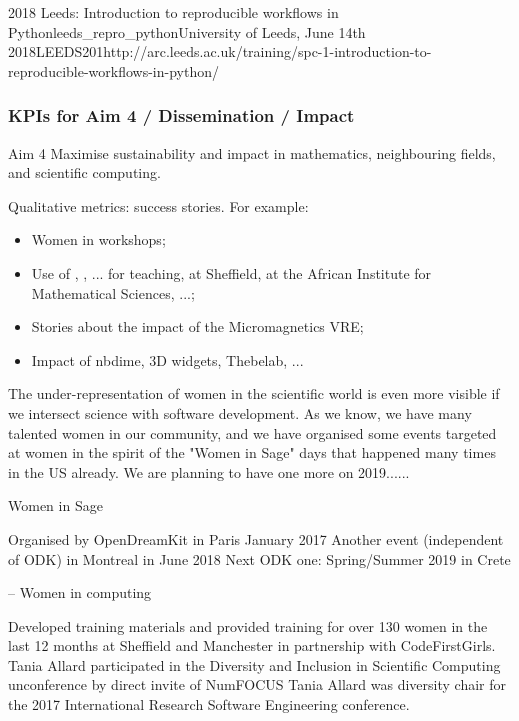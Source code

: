 \begin{Aim 1}
\begin{Aim 2}
\begin{event}{2018 Leeds: Introduction to reproducible workflows in Python}{leeds_repro_python}{University of Leeds, June 14th 2018}{LEEDS}{20}{1}{http://arc.leeds.ac.uk/training/spc-1-introduction-to-reproducible-workflows-in-python/}
\begin{itemize}
\subsubsection{KPIs for Aim 4 / Dissemination / Impact}

\begin{recommendation}{Aim 4}
  Maximise sustainability and impact in mathematics, neighbouring fields, and scientific computing.
\end{recommendation}

Qualitative metrics: success stories. For example:
\begin{itemize}
\item Women in \Sage workshops;
\item Use of \Jupyter, \cocalc, ... for teaching, at Sheffield, at the
  African Institute for Mathematical Sciences, ...;
\item Stories about the impact of the Micromagnetics VRE;
\item Impact of nbdime, 3D widgets, Thebelab, ...
\end{itemize}

 
 
 The under-representation of women in the scientific world is even
  more visible if we intersect science with software
  development. As we know, we have many talented women in our
  community, and we have organised some events targeted at women in the
  spirit of the "Women in Sage" days that happened many times in the
  US already. We are planning to have one more on 2019......

Women in Sage

    Organised by OpenDreamKit in Paris January 2017
    Another event (independent of ODK) in Montreal in June 2018
    Next ODK one: Spring/Summer 2019 in Crete

-- Women in computing

    Developed training materials and provided training for over 130 women in the last 12 months at Sheffield and Manchester in partnership with CodeFirstGirls.
    Tania Allard participated in the Diversity and Inclusion in Scientific Computing unconference by direct invite of NumFOCUS
    Tania Allard was diversity chair for the 2017 International Research Software Engineering conference.


\end{itemize}
\end{event}
\end{Aim 2}
\end{Aim 1}
